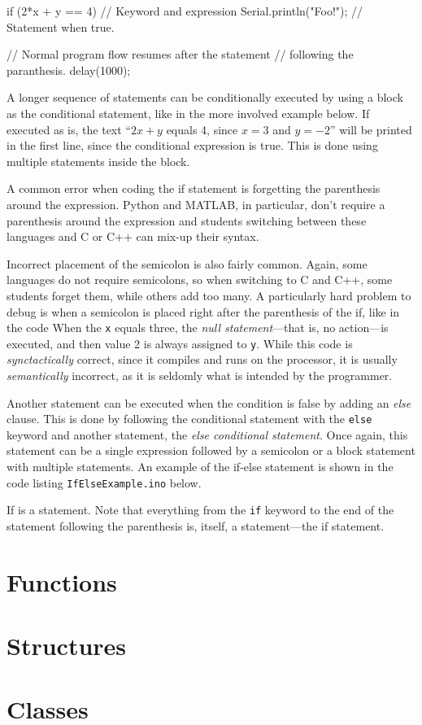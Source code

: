 \begin{inocode}
if (2*x + y == 4)        // Keyword and expression
  Serial.println("Foo!"); // Statement when true.

// Normal program flow resumes after the statement
// following the paranthesis.
delay(1000);
\end{inocode}

A longer sequence of statements can be conditionally executed by using a block as the conditional statement, like in the more involved example below.
If executed as is, the text ``$2x + y$ equals 4, since $x=3$ and $y=-2$'' will be printed in the first line, since the conditional expression is true.
This is done using multiple statements inside the block.


A common error when coding the if statement is forgetting the parenthesis around the expression.
Python and MATLAB, in particular, don't require a parenthesis around the expression and students switching between these languages and C or C++ can mix-up their syntax.

Incorrect placement of the semicolon is also fairly common.
Again, some languages do not require semicolons, so when switching to C and C++, some students forget them, while others add too many.
A particularly hard problem to debug is when a semicolon is placed right after the parenthesis of the if, like in the code 
When the \texttt{x} equals three, the \emph{null statement}---that is, no action---is executed, and then value 2 is always assigned to \texttt{y}.
While this code is \emph{synctactically} correct, since it compiles and runs on the processor, it is usually \emph{semantically} incorrect, as it is seldomly what is intended by the programmer.

Another statement can be executed when the condition is false by adding an \emph{else} clause.
This is done by following the conditional statement with the \texttt{else} keyword and another statement, the \emph{else conditional statement}.
Once again, this statement can be a single expression followed by a semicolon or a block statement with multiple statements.
An example of the if-else statement is shown in the code listing \texttt{IfElseExample.ino} below.



\pending{} If is a statement. 
Note that everything from the \texttt{if} keyword to the end of the statement following the parenthesis is, itself, a statement---the if statement.

\section{Functions}
\section{Structures}
\section{Classes}


